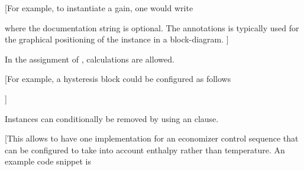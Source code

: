 \documentclass[letterpaper,10pt, openany,english]{sphinxmanual}
\begin{document}
{[}For example, to instantiate a gain, one would write

\begin{sphinxVerbatim}[commandchars=\\\{\}]
   
\end{sphinxVerbatim}

where the documentation string is optional.
The annotations is typically used
for the graphical positioning of the instance in a block-diagram.
{]}

In the assignment of , calculations are allowed.

{[}For example, a hysteresis block could be configured as follows

\begin{sphinxVerbatim}[commandchars=\\\{\}]
     

 
     
     
\end{sphinxVerbatim}

{]}

Instances can conditionally be removed by using an  clause.

{[}This allows to have one implementation for an economizer control sequence
that can be configured to take into account enthalpy rather than
temperature. An example code snippet is

\begin{sphinxVerbatim}[commandchars=\\\{\}]
    

   
\end{sphinxVerbatim}
\end{document}
